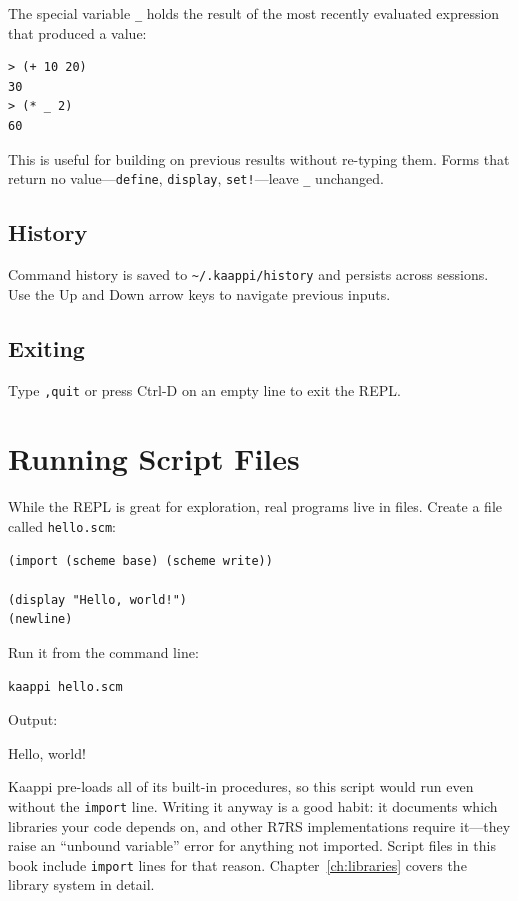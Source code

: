 The special variable \texttt{\_} holds the result of the most recently evaluated expression that produced a value:

\begin{lstlisting}[style=repl]
> (+ 10 20)
30
> (* _ 2)
60
\end{lstlisting}

This is useful for building on previous results without re-typing them. Forms that return no value---\texttt{define}, \texttt{display}, \texttt{set!}---leave \texttt{\_} unchanged.

\subsection{History}

Command history is saved to \texttt{\textasciitilde/.kaappi/history} and persists across sessions. Use the Up and Down arrow keys to navigate previous inputs.

\subsection{Exiting}

Type \texttt{,quit} or press Ctrl-D on an empty line to exit the REPL.

\section{Running Script Files}

While the REPL is great for exploration, real programs live in files. Create a file called \texttt{hello.scm}:

\begin{lstlisting}
(import (scheme base) (scheme write))

(display "Hello, world!")
(newline)
\end{lstlisting}

Run it from the command line:

\begin{Verbatim}[fontsize=\small]
kaappi hello.scm
\end{Verbatim}

Output:

\begin{codeoutput}
Hello, world!
\end{codeoutput}

\begin{note}
Kaappi pre-loads all of its built-in procedures, so this script would run even without the \texttt{import} line. Writing it anyway is a good habit: it documents which libraries your code depends on, and other R7RS implementations require it---they raise an ``unbound variable'' error for anything not imported. Script files in this book include \texttt{import} lines for that reason. Chapter~\ref{ch:libraries} covers the library system in detail.
\end{note}

